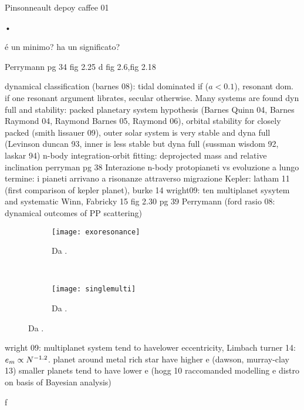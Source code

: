\begin{workout}
Pinsonneault depoy caffee 01
\end{workout}•

\begin{workout}
\'e un minimo? ha un significato?
\end{workout}

\begin{workout}
Perrymann pg 34 fig 2.25 d
fig 2.6,fig 2.18
\end{workout}

\begin{workout}
dynamical classification (barnes 08): tidal dominated if ($a<0.1$), resonant dom. if one resonant argument librates, secular otherwise.
Many systems are found dyn full and stability: packed planetary system hypothesis (Barnes Quinn 04, Barnes Raymond 04, Raymond Barnes 05, Raymond 06), orbital stability for closely packed (smith lissauer 09), outer solar system is very stable and dyna full (Levinson duncan 93, inner is less stable but dyna full (sussman wisdom 92, laskar 94)
n-body integration-orbit fitting: deprojected mass and relative inclination
perryman pg 38
Interazione n-body protopianeti vs evoluzione a lungo termine: i pianeti arrivano a risonanze attraverso migrazione
Kepler: latham 11 (first comparison of kepler planet), burke 14
wright09: ten multiplanet sysytem and systematic
Winn, Fabricky 15
fig 2.30 pg 39 Perrymann
(ford rasio 08: dynamical outcomes of PP scattering)

\begin{figure}[!ht]
\begin{subfigure}[b]{0.47\textwidth}
\centering
\texttt{[image: exoresonance]}
\caption{Da \cite{winnfabrycky15}.}\label{fig:exoresonance}
\end{subfigure}
~
\begin{subfigure}[b]{0.47\textwidth}
\centering
\texttt{[image: singlemulti]}
\caption{Da \cite{wright09}.}\label{fig:singlemulti}
\end{subfigure}
\end{figure}
\end{workout}

\begin{workout}
wright 09: multiplanet system tend to havelower eccentricity,
Limbach turner 14: $e_m\propto N^{-1.2}$.
planet around metal rich star have higher e (dawson, murray-clay 13)
smaller planets tend to have lower e (hogg 10 raccomanded modelling e distro on basis of Bayesian analysis)
\end{workout}f

